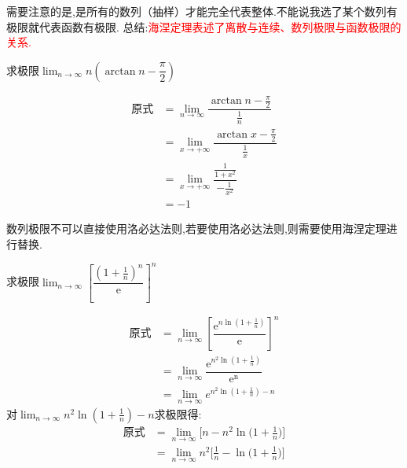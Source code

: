 \documentclass[8pt a4paper, oneside, UTF8]{ctexbook}
\begin{document}
\begin{sloppypar}
\begin{center}
    \end{center}
    需要注意的是,是所有的数列（抽样）才能完全代表整体.不能说我选了某个数列有极限就代表函数有极限.
    总结:\textcolor{red}{海涅定理表述了离散与连续、数列极限与函数极限的关系.}
    \begin{problem}
        求极限$\lim_{n \to \infty}n(\arctan n -\dfrac{\pi}{2})$
    \end{problem}
    \begin{solution}
          \begin{align*}
            \text{原式} & = \lim_{n \to \infty}\dfrac{\arctan n-\frac{\pi}{2}}{\frac{1}{n}} \\     
            & =  \lim_{x \to +\infty}\dfrac{\arctan x -\frac{\pi}{2}}{\frac{1}{x}}\\
            & = \lim_{x\to+\infty}\dfrac{\frac1{1+x^2}}{-\frac1{x^2}}\\
            & = -1
          \end{align*}  
    \end{solution}
    \begin{note}
        数列极限不可以直接使用洛必达法则,若要使用洛必达法则,则需要使用海涅定理进行替换.
    \end{note}
    \begin{problem}
        求极限$\lim_{n\to\infty}\left[\dfrac{\left(1+\frac1n\right)^n}{\mathrm{e}}\right]^n$   
    \end{problem}
    \begin{solution}
        \begin{align*}
          \text{原式} & = \lim_{n\to\infty}\left[\dfrac{\mathrm{e}^{n\ln\left(1+\frac1n\right)}}{\mathrm{e}}\right]^n    \\
          & = \lim_{n\to\infty}\dfrac{\mathrm{e}^{n^2\ln\left(1+\frac1n\right)}}{\mathrm{e^n}}\\
          & =\lim_{n \to \infty} e^{n^2\ln(1+\frac{1}{n})-n}
        \end{align*}
        对$\lim_{n \to \infty} n^2\ln(1+\frac{1}{n})-n$求极限得:
        \begin{align*}
          \text{原式} & = \lim_{n\to\infty}\biggl[n-n^2\ln\biggl(1+\frac{1}{n}\biggr)\biggr] \\
          & =  \lim_{n\to\infty}n^2\biggl[\frac{1}{n}-\ln\biggl(1+\frac{1}{n}\biggr)\biggr] \\

\end{align*}
\end{solution}
\end{sloppypar}
\end{document}
